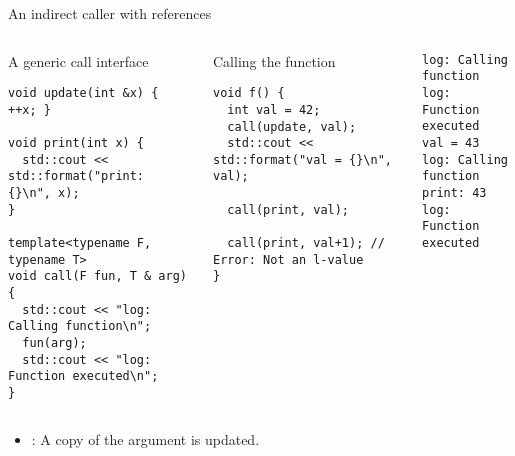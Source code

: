 \begin{frame}[t,fragile]{An indirect caller with references}
\begin{columns}[T]

\begin{block}{A generic call interface}
\begin{lstlisting}
void update(int &x) { ++x; }

void print(int x) {
  std::cout << std::format("print: {}\n", x);
}

template<typename F, typename T>
void call(F fun, T & arg) {
  std::cout << "log: Calling function\n";
  fun(arg);
  std::cout << "log: Function executed\n";
}
\end{lstlisting}
\end{block}

\pause
{}
\begin{block}{Calling the function}
\begin{lstlisting}[basicstyle=\mode<presentation>{\tiny}]
void f() {
  int val = 42;
  call(update, val);
  std::cout << std::format("val = {}\n", val);

  call(print, val);

  call(print, val+1); // Error: Not an l-value
}
\end{lstlisting}
\end{block}
\pause
\begin{lstlisting}[style=terminal,basicstyle=\mode<presentation>{\tiny}]
log: Calling function
log: Function executed
val = 43
log: Calling function
print: 43
log: Function executed
\end{lstlisting}

\end{columns}

\begin{itemize}
  \item {}: A copy of the argument is updated. 
\end{itemize}
\end{frame}

